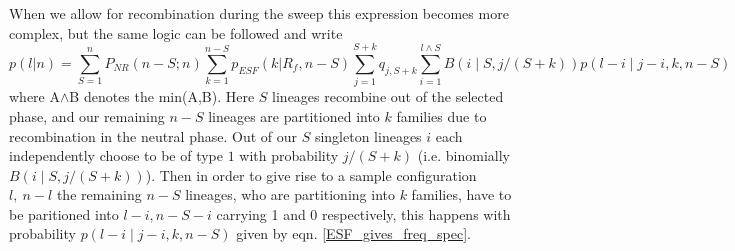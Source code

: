\documentclass[a4paper,10pt]{article}
\begin{document}
When we allow for recombination during the sweep this expression becomes more complex, but the same logic can be followed and write
\begin{equation}
p(l | n) = \sum_{S=1}^n P_{NR}(n-S; n) \sum_{k=1}^{n-S} p_{ESF}(k | R_f,n-S) \sum_{j=1}^{S+k} q_{j,S+k}
\sum_{i=1}^{l \wedge S} B(i \mid S,j/(S+k)) p(l-i \mid j-i,k,n-S )
\end{equation}
where A$\wedge$B denotes the min(A,B). Here $S$ lineages recombine out of the selected phase, and our remaining $n-S$ lineages are partitioned into $k$ families due to recombination in the neutral phase. Out of our $S$ singleton lineages $i$ each independently choose to be of type $1$ with probability $j/(S+k)$ (i.e. binomially $ B(i \mid S,j/(S+k))$). Then in order to give rise to a sample configuration $l,~n-l$ the remaining $n-S$ lineages, who are partitioning into $k$ families, have to be paritioned into $l-i,n-S-i$ carrying 1 and 0 respectively, this happens with probability $p(l-i \mid j-i,k,n-S )$ given by eqn. \eqref{ESF_gives_freq_spec}.   




\end{document}
